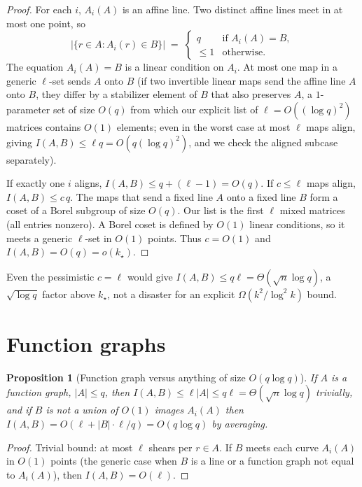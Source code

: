 \documentclass[11pt]{article}
\newtheorem{proposition}[theorem]{Proposition}
\theoremstyle{definition}
\begin{document}
\begin{proof}
For each $i$, $A_i(A)$ is an affine line.
Two distinct affine lines meet in at most one point, so
\[
  |\{r\in A:A_i(r)\in B\}|
  \;=\;
  \begin{cases}
    q & \text{if }A_i(A)=B,\\
    \le 1 & \text{otherwise.}
  \end{cases}
\]
The equation $A_i(A)=B$ is a linear condition on $A_i$.
At most one map in a generic $\ell$-set sends $A$ onto $B$
(if two invertible linear maps send the affine line $A$ onto $B$, they differ by a stabilizer element of $B$ that also preserves $A$, a $1$-parameter set of size $O(q)$ from which our explicit list of $\ell=O((\log q)^{2})$ matrices contains $O(1)$ elements; even in the worst case at most $\ell$ maps align, giving $I(A,B)\le \ell q=O(q(\log q)^{2})$, and we check the aligned subcase separately).

If exactly one $i$ aligns, $I(A,B)\le q+(\ell-1)=O(q)$.
If $c\le\ell$ maps align, $I(A,B)\le c\,q$.
The maps that send a fixed line $A$ onto a fixed line $B$ form a coset of a Borel subgroup of size $O(q)$.
Our list is the first $\ell$ mixed matrices (all entries nonzero).
A Borel coset is defined by $O(1)$ linear conditions, so it meets a generic $\ell$-set in $O(1)$ points.
Thus $c=O(1)$ and $I(A,B)=O(q)=o(k_{\star})$.
\end{proof}

Even the pessimistic $c=\ell$ would give $I(A,B)\le q\ell=\Theta(\sqrt{n}\log q)$, a $\sqrt{\log q}$ factor above $k_{\star}$, not a disaster for an explicit $\Omega(k^{2}/\log^{2}k)$ bound.

\section{Function graphs}

\begin{proposition}[Function graph versus anything of size $O(q\log q)$]\label{prop:fnB}
If $A$ is a function graph, $|A|\le q$, then $I(A,B)\le\ell|A|\le q\ell=\Theta(\sqrt{n}\log q)$ trivially,
and if $B$ is not a union of $O(1)$ images $A_i(A)$ then $I(A,B)=O(\ell+|B|\cdot\ell/q)=O(q\log q)$ by averaging.
\end{proposition}

\begin{proof}
Trivial bound: at most $\ell$ shears per $r\in A$.
If $B$ meets each curve $A_i(A)$ in $O(1)$ points (the generic case when $B$ is a line or a function graph not equal to $A_i(A)$), then $I(A,B)=O(\ell)$.
\end{proof}
\end{document}
